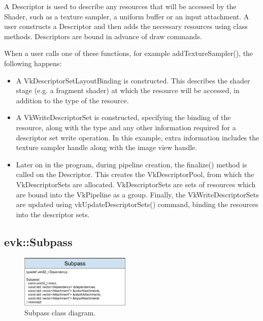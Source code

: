 \documentclass[12pt]{report}
\newcommand{\figurewidth}{0.55\textwidth}
\newcommand{\imagewidth}{0.47\textwidth}
\theoremstyle{definition}
\begin{document}
        A Descriptor is used to describe any resources that will be accessed by
        the Shader, such as a texture sampler, a uniform buffer or an input
        attachment. A user constructs a Descriptor and then adds the necessary
        resources using class methods. Descriptors are bound in advance of draw
        commands.

        When a user calls one of these functions, for example
        addTextureSampler(), the following happens:

        \begin{itemize}
          \item A VkDescriptorSetLayoutBinding is constructed. This describes
            the shader stage (e.g. a fragment shader) at which the resource
            will be accessed, in addition to the type of the resource.
          \item A VkWriteDescriptorSet is constructed, specifying the binding
            of the resource, along with the type and any other information
            required for a descriptor set write operation. In this example,
            extra information includes the texture sampler handle along with
            the image view handle.
          \item Later on in the program, during pipeline creation, the
            finalize() method is called on the Descriptor. This creates the
            VkDescriptorPool, from which the VkDescriptorSets are allocated.
            VkDescriptorSets are sets of resources which are bound into the
            VkPipeline as a group. Finally, the VkWriteDescriptorSets are
            updated using vkUpdateDescriptorSets() command, binding the
            resources into the descriptor sets.
        \end{itemize}

      \subsection{evk::Subpass}

        \begin{figure}
          \centering
          \includegraphics[width=\imagewidth]{images/class_subpass.png}
          \caption{Subpass class diagram.}
          \label{fig:class_subpass}
        \end{figure}
\end{document}
